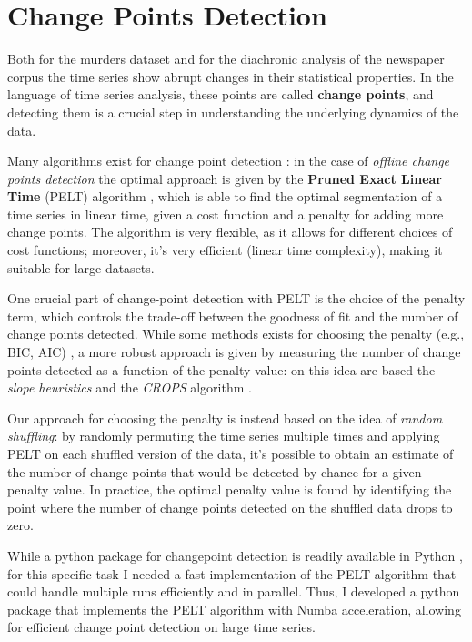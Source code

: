 \section{Change Points Detection}

Both for the murders dataset and for the diachronic analysis of the newspaper corpus the time series show abrupt changes in their statistical properties. In the language of time series analysis, these points are called \textbf{change points}, and detecting them is a crucial step in understanding the underlying dynamics of the data.

Many algorithms exist for change point detection \cite{truongSelectiveReviewOffline2020}: in the case of \textit{offline change points detection} the optimal approach is given by the \textbf{Pruned Exact Linear Time} (PELT) algorithm \cite{killickOptimalDetectionChangepoints2012}, which is able to find the optimal segmentation of a time series in linear time, given a cost function and a penalty for adding more change points. The algorithm is very flexible, as it allows for different choices of cost functions; moreover, it's very efficient (linear time complexity), making it suitable for large datasets.

One crucial part of change-point detection with PELT is the choice of the penalty term, which controls the trade-off between the goodness of fit and the number of change points detected. While some methods exists for choosing the penalty (e.g., BIC, AIC) \cite{truongSelectiveReviewOffline2020}, a more robust approach is given by measuring the number of change points detected as a function of the penalty value: on this idea are based the \textit{slope heuristics} \cite{baudrySlopeHeuristicsOverview2012} and the \textit{CROPS} algorithm \cite{haynesEfficientPenaltySearch2014}.

Our approach for choosing the penalty is instead based on the idea of \textit{random shuffling}: by randomly permuting the time series multiple times and applying PELT on each shuffled version of the data, it's possible to obtain an estimate of the number of change points that would be detected by chance for a given penalty value. 
In practice, the optimal penalty value is found by identifying the point where the number of change points detected on the shuffled data drops to zero.

While a python package for changepoint detection is readily available in Python \cite{truongSelectiveReviewOffline2020}, for this specific task I needed a fast implementation of the PELT algorithm that could handle multiple runs efficiently and in parallel. Thus, I developed a python package that implements the PELT algorithm with Numba acceleration, allowing for efficient change point detection on large time series.

